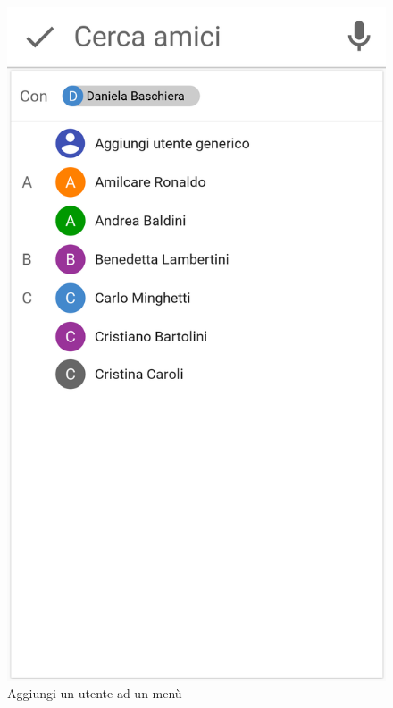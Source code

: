 \begin{figure}[H]
	\begin{minipage}{.49\textwidth}
		\includegraphics[width=\textwidth]{img/wireframe/aggiungi_utente_daniela.png}
		\caption{Aggiungi un utente ad un menù}
		\label{fig:aggiungi_utente}
	\end{minipage}
	\hfill
	\begin{minipage}{.49\textwidth}

\end{minipage}
\end{figure}
